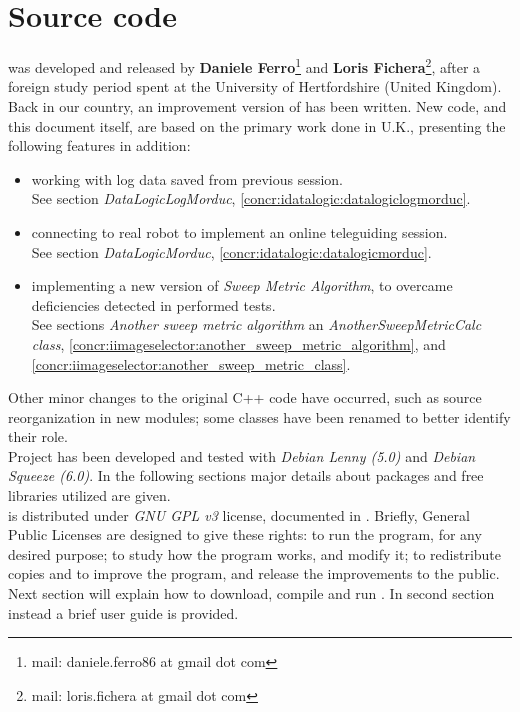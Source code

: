 \setcounter{figure}{0}
\setcounter{table}{0}
\setcounter{lstlisting}{0}

\chapter{Source code}
\label{sourcecode}
\minitoc

\framework{} was developed and released
by \textbf{Daniele Ferro}\footnote{mail: daniele.ferro86
at gmail dot com}
and
\textbf{Loris Fichera}\footnote{mail: loris.fichera
at gmail dot com}, after
a foreign study
period spent at the University of Hertfordshire (United Kingdom).
\\
Back in our country, an improvement version of \framework{} has
been written.
New code, and this document itself, are based on the primary
work done in U.K., presenting the following features in
addition:

\begin{itemize}

\item working with log data saved from previous
      \morduc{} session. \\
      See section \textit{DataLogicLogMorduc},
      \ref{concr:idatalogic:datalogiclogmorduc}.
      

\item connecting to real \morduc{} robot to implement
      an online teleguiding session. \\
      See section \textit{DataLogicMorduc},
      \ref{concr:idatalogic:datalogicmorduc}.

\item implementing a new version of \textit{Sweep Metric
      Algorithm}, to overcame deficiencies detected in
      performed tests. \\
      See sections \textit{Another sweep metric algorithm}
      an \textit{AnotherSweepMetricCalc class},
      \ref{concr:iimageselector:another_sweep_metric_algorithm},
      and
      \ref{concr:iimageselector:another_sweep_metric_class}.

\end{itemize}

Other minor changes to the original C++ code have occurred, such
as source reorganization in new modules; some classes have
been renamed to better identify their role.
\\
Project has been developed and tested with \textit{Debian Lenny (5.0)}
and \textit{Debian Squeeze (6.0)}. In the following sections major
details about packages and free libraries utilized are given.
\\
\framework{} is distributed under \textit{GNU GPL v3} license, 
documented in \cite{license:gplv3}. 
Briefly, General Public Licenses are designed to give these rights: to run the
program, for any desired purpose; to study how the program works, and
modify it; to redistribute copies and to improve the program, and
release the improvements to the public.
\\
Next section will explain how to download, compile and
run \framework{}. In second section instead a brief user guide
is provided.

\clearpage


\clearpage

